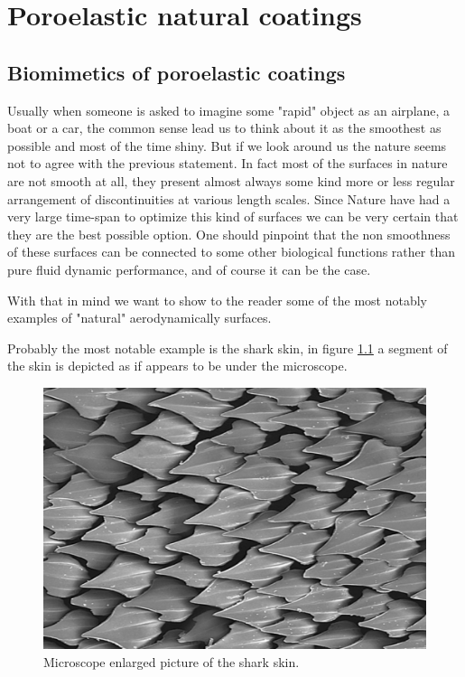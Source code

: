 \chapter{Poroelastic natural coatings}


\section{Biomimetics of poroelastic coatings}

Usually when someone is asked to imagine some "rapid" object as an airplane, a boat or a car, the common sense lead us to think about it as the smoothest as possible and most of the time shiny.
But if we look around us the nature seems not to agree with the previous statement.
In fact most of the surfaces in nature are not smooth at all, they present almost always some kind more or less regular arrangement of discontinuities at various length scales.
Since Nature have had a very large time-span to optimize this kind of surfaces we can be very certain that they are the best possible option.
One should pinpoint that the non smoothness of these surfaces can be connected to some other biological functions rather than pure fluid dynamic performance, and of course it can be the case.


With that in mind we want to show to the reader some of the most notably examples of "natural" aerodynamically surfaces.

Probably the most notable example is the shark skin, in figure \ref{fig:shark} a segment of the skin is depicted as if appears to be under the microscope.

\begin{figure}[h]
	\centering
	\includegraphics[width=0.6\linewidth]{chapter_1/shark}
	\caption{Microscope enlarged picture of the shark skin.}
	\label{fig:shark}
\end{figure}

